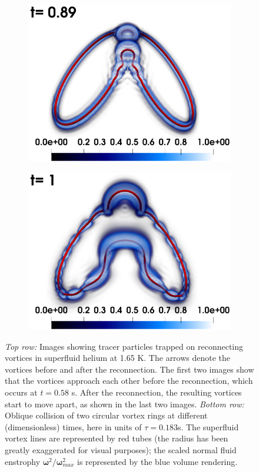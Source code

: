 \documentclass[%
 reprint,
unsortedaddress,
 amsmath,amssymb,
 aps,
 prl,
]{revtex4-2}
\newcommand{\bom}{\boldsymbol{\omega}}
\begin{document}
\begin{figure}[t]
\begin{subfigure}[b]{0.24\textwidth}
		\includegraphics*[width=\textwidth]{snap-3.png}
	\end{subfigure}
    \begin{subfigure}[b]{0.24\textwidth}
		\centering
		\includegraphics*[width=\textwidth]{snap-4.png}
	\end{subfigure}
\caption{\emph{Top row:} Images showing tracer particles trapped on reconnecting vortices in superfluid helium at 1.65 K. The arrows denote the vortices before and after the reconnection. The first two images show that the vortices approach each other before the reconnection, which occurs at $t=0.58$ s. After the reconnection, the resulting vortices start to move apart, as shown in the last two images.
\emph{Bottom row:} Oblique collision of two circular vortex rings at different 
(dimensionless) times, here in units of $\tau=0.183$s.
The superfluid vortex lines are represented by red tubes (the radius has been greatly 
exaggerated for visual purposes); the scaled normal fluid enstrophy 
$\bom^2/\bom^2_{max}$ is represented by the blue volume rendering.}
\label{fig:ring-coll-viz}
\end{figure}
\end{document}

